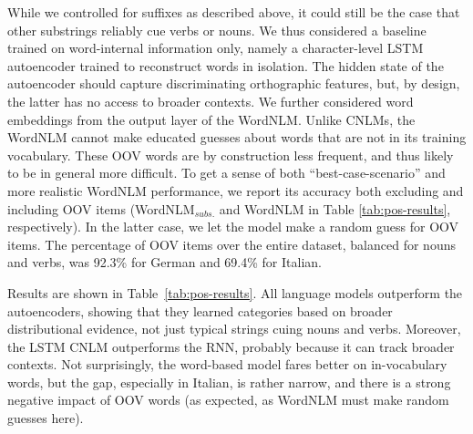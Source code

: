 While we controlled for suffixes as described above, it could still be
the case that other substrings reliably cue verbs or nouns. We thus
considered a baseline trained on word-internal information only,
namely a character-level LSTM autoencoder trained to reconstruct words
in isolation.  The hidden state of the autoencoder should capture
discriminating orthographic features, but, by design, the latter has
no access to broader contexts.  We further considered word embeddings
from the output layer of the WordNLM. Unlike CNLMs, the WordNLM cannot
make educated guesses about words that are not in its training
vocabulary. These OOV words are by construction less frequent, and
thus likely to be in general more difficult. To get a sense of both
``best-case-scenario'' and more realistic WordNLM performance, we
report its accuracy both excluding and including OOV items
(WordNLM$_{\textit{subs.}}$ and WordNLM in Table
\ref{tab:pos-results}, respectively). In the latter case, we let the
model make a random guess for OOV items.  The percentage of OOV items
over the entire dataset, balanced for nouns and verbs, was 92.3\% for
German and 69.4\% for Italian.

Results are shown in Table~\ref{tab:pos-results}.  All language models
outperform the autoencoders, showing that they learned categories
based on broader distributional evidence, not just typical strings
cuing nouns and verbs. Moreover, the LSTM CNLM outperforms the RNN,
probably because it can track broader contexts. Not surprisingly, the
word-based model fares better on in-vocabulary words, but the gap,
especially in Italian, is rather narrow, and there is a strong
negative impact of OOV
words (as expected, as WordNLM must make random guesses here). %

